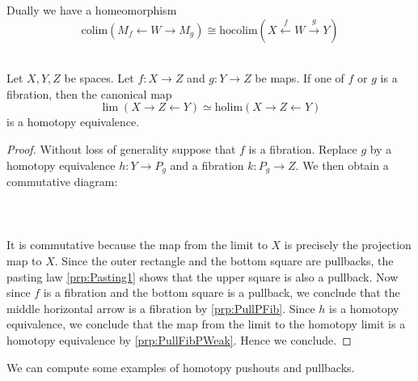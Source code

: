 \documentclass[a4paper]{article}
\begin{document}
Dually we have a homeomorphism $$\text{colim}(M_f\leftarrow W\rightarrow M_g)\cong\text{hocolim}(X\overset{f}{\leftarrow}W\overset{g}{\rightarrow}Y)$$ 

\begin{prp}{}{}\\
Let $X,Y,Z$ be spaces. Let $f:X\to Z$ and $g:Y\to Z$ be maps. If one of $f$ or $g$ is a fibration, then the canonical map $$\lim(X\rightarrow Z\leftarrow Y)\simeq\text{holim}(X\rightarrow Z\leftarrow Y)$$ is a homotopy equivalence. 
\begin{proof}
Without loss of generality suppose that $f$ is a fibration. Replace $g$ by a homotopy equivalence $h:Y\to P_g$ and a fibration $k:P_g\to Z$. We then obtain a commutative diagram:  
 \\~\\  \\~\\
It is commutative because the map from the limit to $X$ is precisely the projection map to $X$. Since the outer rectangle and the bottom square are pullbacks, the pasting law \ref{prp:Pasting1} shows that the upper square is also a pullback. Now since $f$ is a fibration and the bottom square is a pullback, we conclude that the middle horizontal arrow is a fibration by \ref{prp:PullPFib}. Since $h$ is a homotopy equivalence, we conclude that the map from the limit to the homotopy limit is a homotopy equivalence by \ref{prp:PullFibPWeak}. Hence we conclude. 
\end{proof}
\end{prp}

We can compute some examples of homotopy pushouts and pullbacks. 
\end{document}
